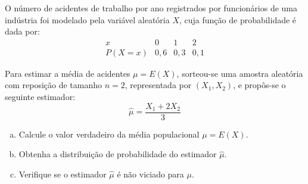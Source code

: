 %
%


\begin{exercicioBanco}[\valorquestao]
O número de acidentes de trabalho por ano registrados por funcionários de uma indústria foi modelado pela variável aleatória $X$, cuja função de probabilidade é dada por:
\[
\begin{array}{c|ccc}
x & 0 & 1 & 2 \\ \hline
P(X = x) & 0{,}6 & 0{,}3 & 0{,}1
\end{array}
\]

\noindent
Para estimar a média de acidentes $\mu = E(X)$, sorteou-se uma amostra aleatória com reposição de tamanho $n = 2$, representada por $(X_1, X_2)$, e propôs-se o seguinte estimador:
\[
\hat{\mu} = \frac{X_1 + 2X_2}{3}
\]

\begin{enumerate}[(a)]
    \item Calcule o valor verdadeiro da média populacional $\mu = E(X)$.
    \item Obtenha a distribuição de probabilidade do estimador $\hat{\mu}$.
    \item Verifique se o estimador $\hat{\mu}$ é não viciado para $\mu$.
\end{enumerate}
\end{exercicioBanco}

